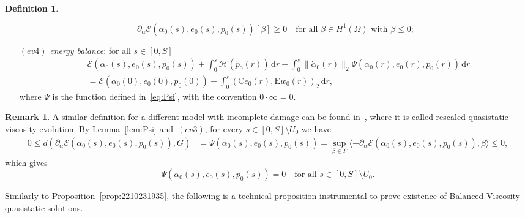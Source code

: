 \documentclass[reqno]{amsart}
\theoremstyle{definition}
\newtheorem{definition}[corollary]{Definition}
\newtheorem{remark}[corollary]{Remark}
\numberwithin{equation}{section}
\def\de {\mathrm{d}}
\def\C {\mathbb C}
\def\EE {\mathrm{E}}
\begin{document}
\begin{definition}
\begin{itemize}
\begin{equation*}
\partial_\alpha\mathcal E(\alpha_0(s),e_0(s),p_0(s))[\beta]\ge 0\quad\text{for all $\beta\in H^1(\Omega)$ with $\beta \le 0$;}
\end{equation*}
\item[$(ev4)$] {\it energy balance}: for all $s\in[0,S]$
\begin{align*}
&\mathcal E(\alpha_0(s),e_0(s),p_0(s))+\int_0^s\mathcal H(\dot p_0(r)) \,\de r+\int_0^s\|\dot\alpha_0(r)\|_2\Psi(\alpha_0(r),e_0(r),p_0(r)) \,\de r\\
&=\mathcal E(\alpha_0(0),e_0(0),p_0(0))+\int_0^s(\C e_0(r),\EE \dot w_0(r))_2 \,\de r,
\end{align*}
where $\Psi$ is the function defined in~\eqref{eq:Psi}, with the convention $0\cdot\infty=0$.
\end{itemize}
\end{definition}

\begin{remark} 
A similar definition for a different model with incomplete damage can be found in~\cite{CrLa}, where it is called rescaled quasistatic viscosity evolution. By Lemma~\ref{lem:Psi} and~$(ev3)$, for every $s\in [0,S]\setminus U_0$ we have
\begin{align*}
 0\le d(\partial_{\alpha}\mathcal E(\alpha_0(s),e_0(s),p_0(s)),G)&=\Psi(\alpha_0(s),e_0(s),p_0(s))=\sup_{\beta\in F}\langle-\partial_{\alpha}\mathcal E(\alpha_0(s),e_0(s),p_0(s)),\beta\rangle\le 0, 
\end{align*}
which gives
$$\Psi(\alpha_0(s),e_0(s),p_0(s))=0\quad\text{for all $s\in [0,S]\setminus U_0$}.$$
\end{remark}

Similarly to Proposition~\ref{prop:2210231935}, the following is a technical proposition instrumental to prove existence of Balanced Viscosity quasistatic solutions.
\end{document}
